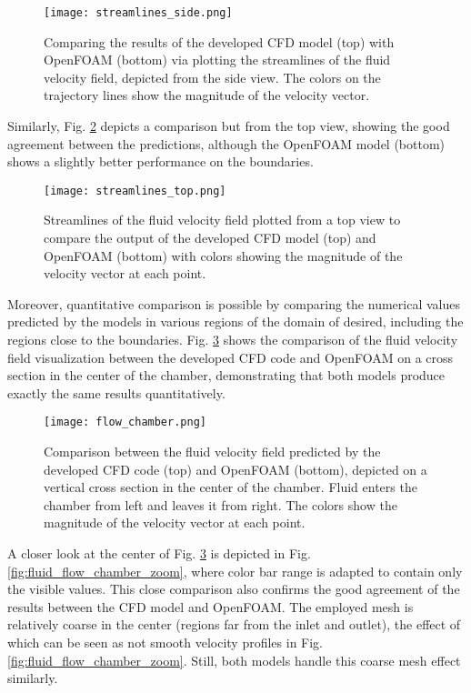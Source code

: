 \begin{figure}[h]
\centering
\medskip
\texttt{[image: streamlines\_side.png]}
\caption[Comparing streamline results of developed CFD code and OpenFOAM - side view]{Comparing the results of the developed CFD model (top) with OpenFOAM (bottom) via plotting the streamlines of the fluid velocity field, depicted from the  side view. The colors on the trajectory lines show the magnitude of the velocity vector.} \label{fig:fluid_streamlines_side}
\end{figure}

Similarly, Fig. \ref{fig:fluid_streamlines_top} depicts a comparison but from the top view, showing the good agreement between the predictions, although the OpenFOAM model (bottom) shows a slightly better performance on the boundaries.

\begin{figure}[h]
\centering
\medskip
\texttt{[image: streamlines\_top.png]}
\caption[Comparing streamline results of developed CFD code and OpenFOAM - top view]{Streamlines of the fluid velocity field plotted from a top view to compare the output of the developed CFD model (top) and OpenFOAM (bottom)  with colors showing the magnitude of the velocity vector at each point.} \label{fig:fluid_streamlines_top}
\end{figure}

Moreover, quantitative comparison is possible by comparing the numerical values predicted by the models in various regions of the domain of desired, including the regions close to the boundaries. Fig. \ref{fig:fluid_flow_chamber} shows the comparison of the fluid velocity field visualization between the developed CFD code and OpenFOAM on a cross section in the center of the chamber, demonstrating that both models produce exactly the same results quantitatively. 

\begin{figure}[h]
\centering
\medskip
\texttt{[image: flow\_chamber.png]}
\caption[Comparing flow field results of developed CFD code and OpenFOAM]{Comparison between the fluid velocity field predicted by the developed CFD code (top) and OpenFOAM (bottom), depicted on a vertical cross section in the center of the chamber. Fluid enters the chamber from left and leaves it from right. The colors show the magnitude of the velocity vector at each point.} \label{fig:fluid_flow_chamber}
\end{figure}

A closer look at the center of Fig. \ref{fig:fluid_flow_chamber} is depicted in Fig. \ref{fig:fluid_flow_chamber_zoom}, where color bar range is adapted to contain only the visible values. This close comparison also confirms the good agreement of the results between the CFD model and OpenFOAM. The employed mesh is relatively coarse in the center (regions far from the inlet and outlet), the effect of which can be seen as not smooth velocity profiles in Fig. \ref{fig:fluid_flow_chamber_zoom}. Still, both models handle this coarse mesh effect similarly.

